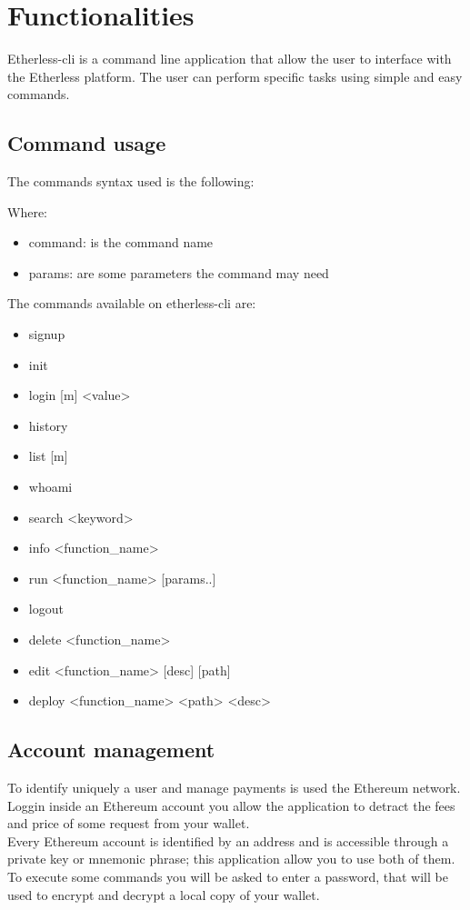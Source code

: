 \section{Functionalities}
Etherless-cli is a command line application that allow the user to interface with the Etherless platform. The user can perform specific tasks using simple and easy commands.

\subsection{Command usage}
The commands syntax used is the following: 
\begin{center}
\end{center} 
Where: 
\begin{itemize}
	\item command: is the command name 
	\item params: are some parameters the command may need
\end{itemize}

\noindent The commands available on etherless-cli are:
\begin{itemize}
	\item signup
	\item init
	\item login [m] <value> 
	\item history 
	\item list [m]
	\item whoami
	\item search <keyword>
	\item info <function\_name>
	\item run <function\_name> [params..]
	\item logout
	\item delete <function\_name> 
	\item edit <function\_name> [desc] [path]
	\item deploy <function\_name> <path> <desc>
\end{itemize}

\subsection{Account management}
To identify uniquely a user and manage payments is used the Ethereum network. Loggin inside an Ethereum account you allow the application to detract the fees and price of some request from your wallet. \\ 
Every Ethereum account is identified by an address and is accessible through a private key or mnemonic phrase; this application allow you to use both of them. \\ 
To execute some commands you will be asked to enter a password, that will be used to encrypt and decrypt a local copy of your wallet. 

